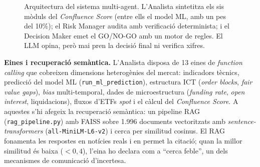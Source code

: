 \documentclass[10pt,twocolumn,a4paper]{article}
\begin{document}
\begin{figure}[t]
\centering
{}
\caption{Arquitectura del sistema multi-agent. L'Analista sintetitza els sis mòduls
del \textit{Confluence Score} (entre ells el model ML, amb un pes del 10\%); el Risk
Manager audita amb verificació determinista; i el Decision Maker emet el GO/NO-GO amb
un motor de regles. El LLM opina, però mai pren la decisió final ni verifica xifres.}
\label{fig:arch}
\end{figure}

\textbf{Eines i recuperació semàntica.} L'Analista disposa de 13 eines de
\textit{function calling} que cobreixen dimensions heterogènies del mercat:
indicadors tècnics, predicció del model ML (\texttt{run\_ml\_prediction}),
estructura ICT (\textit{order blocks}, \textit{fair value gaps}), \textit{bias}
multi-temporal, dades de microestructura (\textit{funding rate}, \textit{open
interest}, liquidacions), fluxos d'ETFs \textit{spot} i el càlcul del
\textit{Confluence Score}. A aquestes s'hi afegeix la recuperació semàntica: un
pipeline RAG (\texttt{rag\_pipeline.py}) amb FAISS sobre 1.996 documents
vectoritzats amb \textit{sentence-transformers} (\texttt{all-MiniLM-L6-v2}) i cerca
per similitud cosinus. El RAG fonamenta les respostes en notícies reals i en permet
la citació; quan la millor similitud és baixa ($<0{,}4$), l'eina ho declara com a
``cerca feble'', un dels mecanismes de comunicació d'incertesa.
\end{document}
